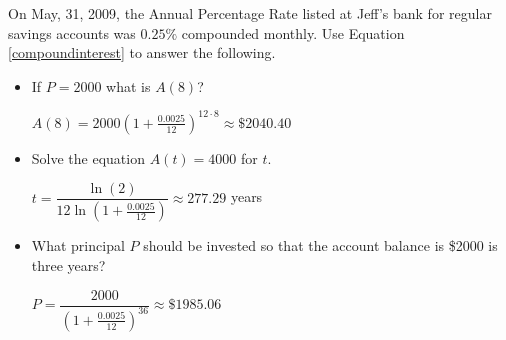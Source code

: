 \documentclass{ximera}
\begin{document}
\begin{problem}
 On May, 31, 2009, the Annual Percentage Rate listed at Jeff's bank for regular savings accounts was $0.25\%$ compounded monthly.  Use Equation \ref{compoundinterest} to answer the following.
\begin{itemize}

\item
    If $P = 2000$ what is $A(8)$?

\begin{solution}
    $A(8) = 2000\left(1 + \frac{0.0025}{12}\right)^{12 \cdot 8} \approx \$2040.40$
\end{solution}


\item
    Solve the equation $A(t) = 4000$ for $t$.

\begin{solution}
     $t = \dfrac{\ln(2)}{12 \ln\left(1 + \frac{0.0025}{12}\right)} \approx 277.29$ years
\end{solution}

\item
    What principal $P$ should be invested so that the account balance is \$2000 is three years?

\begin{solution}
    $P = \dfrac{2000}{\left(1 + \frac{0.0025}{12}\right)^{36}} \approx \$1985.06$
\end{solution}
\end{itemize}
\end{problem}
 
\end{document}
